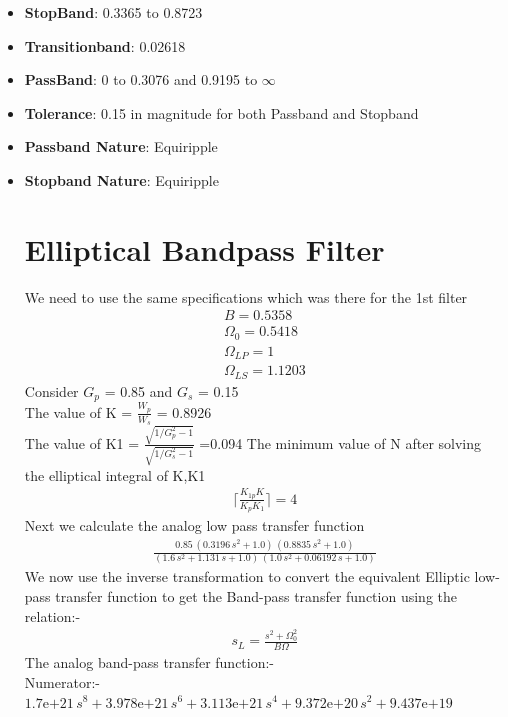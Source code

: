 \documentclass[12pt, letterpaper,]{article}
\begin{document}
\begin{itemize}

\item \textbf{StopBand}: 0.3365 to 0.8723

\item \textbf{Transitionband}: 0.02618

\item \textbf{PassBand}: 0 to 0.3076 and 0.9195 to $\infty$

\item \textbf{Tolerance}: 0.15 in magnitude for both Passband and Stopband

\item \textbf{Passband Nature}: Equiripple

\item \textbf{Stopband Nature}: Equiripple

\section{Elliptical Bandpass Filter}
We need to use the same specifications which was there for the 1st filter
\begin{align*}
    B = 0.5358\\
    \Omega_0 = 0.5418\\
    \Omega_{LP} = 1\\
    \Omega_{LS} = 1.1203
\end{align*}
Consider $G_p$ = 0.85 and $G_s$ = 0.15\\
The value of K = $\frac{W_p}{W_s}$ = 0.8926\\
The value of K1 = $\frac{\sqrt{1/G_p^2-1}}{\sqrt{1/G_s^2-1}}$ =0.094
The minimum value of N after solving the elliptical integral of K,K1\\
\begin{align*}
    \lceil \frac{K_{1p}K}{K_pK_1}\rceil = 4
\end{align*}
Next we calculate the analog low pass transfer function\\
\begin{align*}
    \frac{0.85\,{\left(0.3196\,s^2 +1.0\right)}\,{\left(0.8835\,s^2 +1.0\right)}}{{\left(1.6\,s^2 +1.131\,s+1.0\right)}\,{\left(1.0\,s^2 +0.06192\,s+1.0\right)}}
\end{align*}
We now use the inverse transformation to convert the equivalent Elliptic low-pass
transfer function to get the Band-pass transfer function using the relation:-
\begin{align*}
    s_L = \frac{s^2+\Omega_0^2}{B\Omega}
\end{align*}
The analog band-pass transfer function:-\\
Numerator:-\\
$\text{1.7e+21}\,s^8 +\text{3.978e+21}\,s^6 +\text{3.113e+21}\,s^4 +\text{9.372e+20}\,s^2 +\text{9.437e+19}$\\



\end{itemize}
\end{document}
